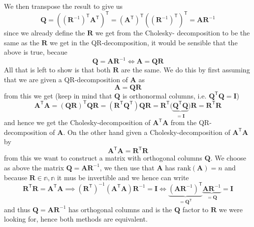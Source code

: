 \documentclass{article}
\newcommand\tr{\mathsf{T}}
\begin{document}
We then transpose the result to give us
\begin{equation*}
    \mathbf{Q} = \left(\left(\mathbf{R}^{-1}\right)^{\tr}\mathbf{A}^{\tr}\right)^{\tr}  = \left(\mathbf{A}^{\tr}\right)^{\tr}\left(\left(\mathbf{R}^{-1}\right)^{\tr}\right)^{\tr} = \mathbf{A}\mathbf{R}^{-1}
\end{equation*}
since we already define the $\mathbf{R}$ we get from the Cholesky- decomposition to be the same as the $\mathbf{R}$ we get in the QR-decomposition, it would be sensible that the above is true, becaue
\begin{equation*}
    \mathbf{Q} = \mathbf{A}\mathbf{R}^{-1} \Longleftrightarrow \mathbf{A} = \mathbf{Q}\mathbf{R}
\end{equation*} 
All that is left to show is that both $\mathbf{R}$ are the same. We do this by first assuming that we are given a QR-decomposition of $\mathbf{A}$ as
\begin{equation*}
    \mathbf{A} = \mathbf{Q}\mathbf{R}
\end{equation*}
from this we get (keep in mind that $\mathbf{Q}$ is orthonormal columns, i.e. $\mathbf{Q}^{\tr}\mathbf{Q} = \mathbf{I}$)
\begin{equation*}
    \mathbf{A}^{\tr}\mathbf{A} = \left(\mathbf{Q}\mathbf{R}\right)^{\tr}\mathbf{Q}\mathbf{R} = \left(\mathbf{R}^{\tr}\mathbf{Q}^{\tr}\right)\mathbf{Q}\mathbf{R} = \mathbf{R}^{\tr}\big(\underbrace{\mathbf{Q}^{\tr}\mathbf{Q}}_{= \mathbf{I}}\big)\mathbf{R} = \mathbf{R}^{\tr}\mathbf{R}
\end{equation*}
and hence we get the Cholesky-decomposition of $\mathbf{A}^{\tr}\mathbf{A}$ from the QR-decomposition of $\mathbf{A}$. On the other hand given a Cholesky-decomposition of $\mathbf{A}^{\tr}\mathbf{A}$ by
\begin{equation*}
    \mathbf{A}^{\tr}\mathbf{A} = \mathbf{R}^{\tr}\mathbf{R}
\end{equation*}
from this we want to construct a matrix with orthogonal columns $\mathbf{
Q}$. We choose as above the matrix $\mathbf{Q} = \mathbf{A}\mathbf{R}^{-1}$, we then use that $\mathbf{A}$ has $\text{rank}\left(\mathbf{A}\right) = n$ and because $\mathbf{R} \in \mathbb{n,n}$ it mus be invertible and we hence can write
\begin{equation*}
    \mathbf{R}^{\tr}\mathbf{R} = \mathbf{A}^{\tr}\mathbf{A} \implies \left(\mathbf{R}^{\tr}\right)^{-1}\left(\mathbf{A}^{\tr}\mathbf{A}\right)\mathbf{R}^{-1} = \mathbf{I} \Longleftrightarrow \underbrace{\left(\mathbf{A}\mathbf{R}^{-1}\right)^{\tr}}_{= \mathbf{Q}^{\tr}}\underbrace{\mathbf{A}\mathbf{R}^{-1}}_{=\mathbf{Q}} = \mathbf{I}
\end{equation*}
and thus $\mathbf{Q} = \mathbf{A}\mathbf{R}^{-1}$ has orthogonal columns and is the $\mathbf{Q}$ factor to $\mathbf{R}$ we were looking for, hence both methods are equivalent.
\end{document}
